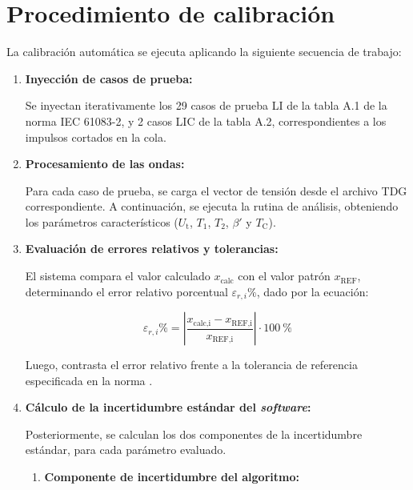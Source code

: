 \section{Procedimiento de calibración}
\label{sec:procedimiento_calibracion}
\vspace{3\baselineskip}

La calibración automática se ejecuta aplicando la siguiente secuencia de trabajo:

\begin{enumerate}
    \item \textbf{Inyección de casos de prueba:}
    
    Se inyectan iterativamente los \num{29} casos de prueba LI de la tabla A.1 de la norma IEC 61083-2\cite{iec61083_2}, y \num{2} casos LIC de la tabla A.2, correspondientes a los impulsos cortados en la cola.

    \item \textbf{Procesamiento de las ondas:}

    Para cada caso de prueba, se carga el vector de tensión desde el archivo TDG correspondiente. A continuación, se ejecuta la rutina de análisis, obteniendo los parámetros característicos ($U_\text{t}$, $T_1$, $T_2$, $\beta'$ y $T_\text{C}$).

    \item \textbf{Evaluación de errores relativos y tolerancias:}
    
    El sistema compara el valor calculado $x_{\text{calc}}$ con el valor patrón $x_{\text{REF}}$, determinando el error relativo porcentual $\varepsilon_{r,i}\%$, dado por la ecuación:

    \begin{equation}
        \varepsilon_{r,i}\% = \left| \frac{x_{\text{calc,i}} - x_{\text{REF,i}}}{x_{\text{REF,i}}} \right| \cdot \qty{100}{\percent}
        \label{eq:error_relativo}
    \end{equation}

    Luego, contrasta el error relativo frente a la tolerancia de referencia especificada en la norma \cite{iec61083_2}.

    \item \textbf{Cálculo de la incertidumbre estándar del \emph{software}:}
    
    Posteriormente, se calculan los dos componentes de la incertidumbre estándar, para cada parámetro evaluado.

    \begin{enumerate}
        \item \textbf{Componente de incertidumbre del algoritmo:}
        

\end{enumerate}
\end{enumerate}
